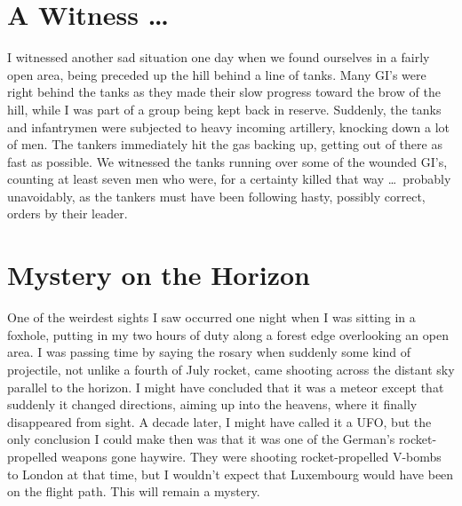 \documentclass[../m3y]{subfiles}
\begin{document}
\section{A Witness \ldots}
I witnessed another sad situation one day when we found ourselves in a fairly open area, being preceded up the hill behind a line of tanks. Many GI's were right behind the tanks as they made their slow progress toward the brow of the hill, while I was part of a group being kept back in reserve. Suddenly, the tanks and infantrymen were subjected to heavy incoming artillery, knocking down a lot of men. The tankers immediately hit the gas backing up, getting out of there as fast as possible. We witnessed the tanks running over some of the wounded GI's, counting at least seven men who were, for a certainty killed that way \ldots\ probably unavoidably, as the tankers must have been following hasty, possibly correct, orders by their leader.

\section{Mystery on the Horizon}
One of the weirdest sights I saw occurred one night when I was sitting in a foxhole, putting in my two hours of duty along a forest edge overlooking an open area. I was passing time by saying the rosary when suddenly some kind of projectile, not unlike a fourth of July rocket, came shooting across the distant sky parallel to the horizon. I might have concluded that it was a meteor except that suddenly it changed directions, aiming up into the heavens, where it finally disappeared from sight. A decade later, I might have called it a UFO, but the only conclusion I could make then was that it was one of the German's rocket-propelled weapons gone haywire. They were shooting rocket-propelled V-bombs to London at that time, but I wouldn't expect that Luxembourg would have been on the flight path. This will remain a mystery.
\end{document}
